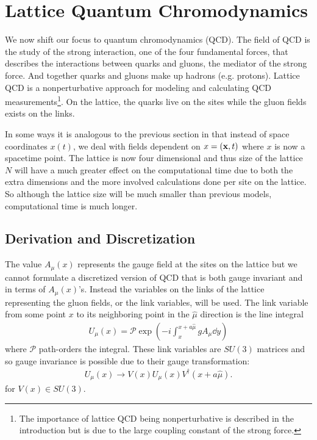 \documentclass[11pt]{article}
\begin{document}
\section{Lattice Quantum Chromodynamics}
We now shift our focus to quantum chromodynamics (QCD). The field of QCD is the study of the strong interaction, one of the four fundamental forces, that describes the interactions between quarks and gluons, the mediator of the strong force. And together quarks and gluons make up hadrons (e.g. protons). Lattice QCD is a nonperturbative approach for modeling and calculating QCD measurements\footnote{The importance of lattice QCD being nonperturbative is described in the introduction but is due to the large coupling constant of the strong force.}. On the lattice, the quarks live on the sites while the gluon fields exists on the links.

In some ways it is analogous to the previous section in that instead of space coordinates $x(t)$, we deal with fields dependent on $x=(\vb{x},t)$ where $x$ is now a spacetime point. The lattice is now four dimensional and thus size of the lattice $N$ will have a much greater effect on the computational time due to both the extra dimensions and the more involved calculations done per site on the lattice. So although the lattice size will be much smaller than previous models, computational time is much longer.

\subsection{Derivation and Discretization}
The value $A_\mu(x)$ represents the gauge field at the sites on the lattice but we cannot formulate a discretized version of QCD that is both gauge invariant and in terms of $A_\mu(x)$'s. Instead the variables on the links of the lattice representing the gluon fields, or the link variables, will be used. The link variable from some point $x$ to its neighboring point in the $\hat{\mu}$ direction is the line integral
\begin{align}
	U_\mu(x)=\mathcal{P}\exp\left(-i\int_x^{x+a\hat{\mu}}gA_\mu\dd{y}\right)
\end{align}
where $\mathcal{P}$ path-orders the integral. These link variables are $SU(3)$ matrices and so gauge invariance is possible due to their gauge transformation:
\begin{align}
	U_\mu(x)\to V(x)U_\mu(x)V^\dagger(x+a\hat{\mu}).
\end{align}
for $V(x)\in SU(3)$.
\end{document}
